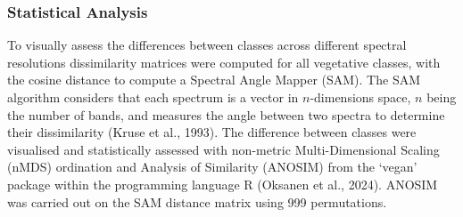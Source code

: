 \documentclass[
  letterpaper,
  11pt,
  english,
  singlespacing,
  headsepline]{MastersDoctoralThesis}
\begin{document}
\begin{spacing}{1.5}
\subsubsection{Statistical Analysis}\label{statistical-analysis}

To visually assess the differences between classes across different
spectral resolutions dissimilarity matrices were computed for all
vegetative classes, with the cosine distance to compute a Spectral Angle
Mapper (SAM). The SAM algorithm considers that each spectrum is a vector
in \(n\)-dimensions space, \(n\) being the number of bands, and measures
the angle between two spectra to determine their dissimilarity (Kruse et
al., 1993). The difference between classes were visualised and
statistically assessed with non-metric Multi-Dimensional Scaling (nMDS)
ordination and Analysis of Similarity (ANOSIM) from the `vegan' package
within the programming language R (Oksanen et al., 2024). ANOSIM was
carried out on the SAM distance matrix using 999 permutations.


\end{spacing}
\end{document}
